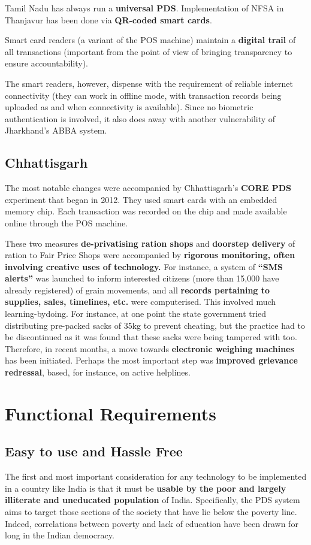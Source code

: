 \documentclass[a4paper,12pt]{extarticle}
\begin{document}
Tamil Nadu has always run a \textbf{universal PDS}. Implementation of NFSA in Thanjavur has been done via \textbf{QR-coded smart cards}. 

Smart card readers (a variant of the POS machine) maintain a\textbf{ digital trail} of all transactions (important from the point of view of bringing transparency to ensure accountability).

The smart readers, however, dispense with the requirement of reliable internet connectivity (they can work in offline mode, with transaction records being uploaded as and when connectivity is available). Since no biometric authentication is involved, it also does away with another vulnerability of Jharkhand’s ABBA system.

\subsection{Chhattisgarh}
The most notable changes were accompanied by Chhattisgarh’s \textbf{CORE PDS }experiment that began in 2012. They used smart cards with an embedded memory chip. Each transaction was recorded on the chip and made available online through the POS machine.

These two measures \textbf{de-privatising ration shops} and \textbf{doorstep delivery} of ration to Fair Price Shops were accompanied by \textbf{rigorous monitoring, often involving creative uses of technology.} For instance, a system of\textbf{ “SMS alerts” }was launched to inform interested citizens (more than 15,000 have already registered) of grain movements, and all \textbf{records pertaining to supplies, sales, timelines, etc.} were computerised. This involved much learning-bydoing. For instance, at one point the state government tried distributing pre-packed sacks of 35kg to prevent cheating, but the practice had to be discontinued as it was found that these sacks were being tampered with too. Therefore, in recent months, a move towards\textbf{ electronic weighing machines }has been initiated. Perhaps the most important step was \textbf{improved grievance redressal}, based, for instance, on active helplines. 



\section{Functional Requirements}

\subsection{Easy to use and Hassle Free}
The first and most important consideration for any technology to be implemented in a country like India is that it must be \textbf{usable by the poor and largely illiterate and uneducated population} of India. Specifically, the PDS system aims to target those sections of the society that have lie below the poverty line. Indeed, correlations between poverty and lack of education have been drawn for long in the Indian democracy. 
\end{document}
